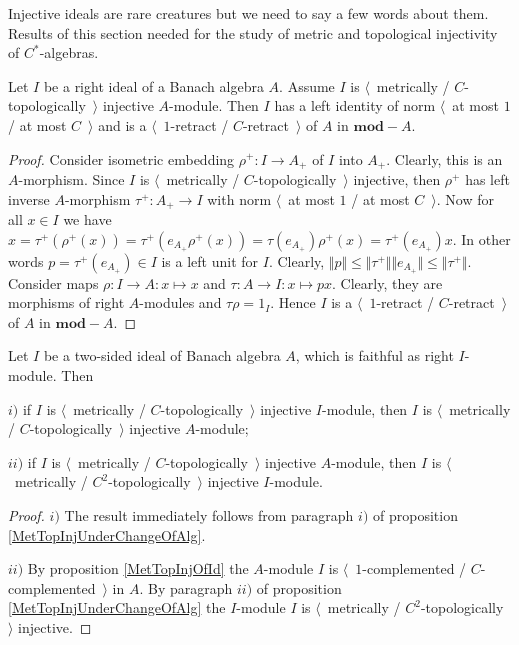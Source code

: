 Injective ideals are rare creatures but we need to say a few words about them. Results of this section needed for the study of metric and topological injectivity of $C^*$-algebras.

\begin{proposition}\label{MetTopInjOfId} Let $I$ be a right ideal of a Banach algebra $A$. Assume $I$ is $\langle$~metrically / $C$-topologically~$\rangle$ injective $A$-module. Then $I$ has a left identity of norm $\langle$~at most $1$ / at most $C$~$\rangle$ and is a $\langle$~$1$-retract / $C$-retract~$\rangle$ of $A$ in $\mathbf{mod}-A$.
\end{proposition}
\begin{proof} Consider isometric embedding $\rho^+:I\to A_+$ of $I$ into $A_+$. Clearly, this is an $A$-morphism. Since $I$ is $\langle$~metrically / $C$-topologically~$\rangle$ injective, then $\rho^+$ has left inverse $A$-morphism $\tau^+:A_+\to I$ with norm $\langle$~at most $1$ / at most $C$~$\rangle$. Now for all $x\in I$ we have $x=\tau^+(\rho^+(x))=\tau^+(e_{A_+}\rho^+(x))=\tau(e_{A_+})\rho^+(x)=\tau^+(e_{A_+})x$. In other words $p=\tau^+(e_{A_+})\in I$ is a left unit for $I$. Clearly, $\Vert p\Vert\leq\Vert\tau^+\Vert\Vert e_{A_+}\Vert\leq\Vert\tau^+\Vert$. Consider maps $\rho:I\to A:x\mapsto x$ and $\tau:A\to I:x\mapsto p x$. Clearly, they are morphisms of right $A$-modules and $\tau\rho=1_I$. Hence $I$ is a $\langle$~$1$-retract / $C$-retract~$\rangle$ of $A$ in $\mathbf{mod}-A$.
\end{proof}

\begin{proposition}\label{ReduceInjIdToInjAlg} Let $I$ be a two-sided ideal of Banach algebra $A$, which is faithful as right $I$-module. Then

$i)$ if $I$ is $\langle$~metrically / $C$-topologically~$\rangle$ injective $I$-module, then $I$ is $\langle$~metrically / $C$-topologically~$\rangle$ injective $A$-module; 

$ii)$ if $I$ is $\langle$~metrically / $C$-topologically~$\rangle$ injective $A$-module, then $I$ is $\langle$~metrically / $C^2$-topologically~$\rangle$ injective $I$-module.
\end{proposition}
\begin{proof} $i)$ The result immediately follows from paragraph $i)$ of proposition \ref{MetTopInjUnderChangeOfAlg}.

$ii)$ By proposition \ref{MetTopInjOfId} the $A$-module $I$ is $\langle$~$1$-complemented / $C$-complemented~$\rangle$ in $A$. By paragraph $ii)$ of proposition \ref{MetTopInjUnderChangeOfAlg} the $I$-module $I$ is $\langle$~metrically / $C^2$-topologically~$\rangle$ injective.
\end{proof}
